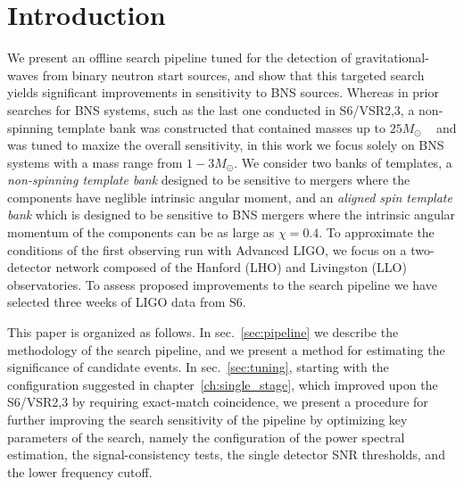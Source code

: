 


\section{Introduction}
\label{sec:introduction}

We present an offline search pipeline tuned for the detection of gravitational-waves from binary neutron start sources, and show that this targeted search yields significant improvements in sensitivity to BNS sources. Whereas in prior searches for BNS systems, such as the last one conducted in S6/VSR2,3, a non-spinning template bank was constructed that contained masses up to $25M_\odot$ ~\cite{Abadie:2011nz} and was tuned to maxize the overall sensitivity, in this work we focus solely on BNS systems with a mass range from $1-3 M_\odot$. We consider two banks of templates, a \emph{non-spinning template bank} designed to be sensitive to mergers where the components have neglible intrinsic angular moment, and an \emph{aligned spin template bank} which is designed to be sensitive to BNS mergers where the intrinsic angular momentum of the components can be as large as $\chi=0.4$. To approximate the conditions of the first observing run with Advanced LIGO, we focus on a two-detector network composed of the Hanford (LHO) and Livingston (LLO) observatories. To assess proposed improvements to the search pipeline we have selected three weeks of LIGO data from S6.

This paper is organized as follows. In sec.~\ref{sec:pipeline} we describe the methodology of the search pipeline, and we present a method for estimating the significance of candidate events. In sec.~\ref{sec:tuning}, starting with the configuration suggested in chapter~\ref{ch:single_stage}, which improved upon the S6/VSR2,3 by requiring exact-match coincidence, we present a procedure for further improving the search sensitivity of the pipeline by optimizing key parameters of the search, namely the configuration of the power spectral estimation, the signal-consistency tests, the single detector SNR thresholds, and the lower frequency cutoff. 

